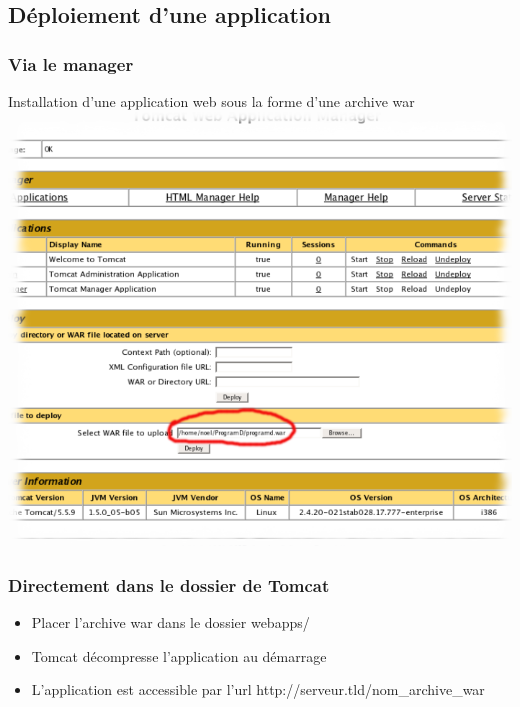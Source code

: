 \subsection{Déploiement d'une application}
\begin{frame}
\frametitle{Via le manager}
	Installation d'une application web sous la forme d'une archive war
  \includegraphics[scale=0.3]{Images/tomcat-deploy-war.png}
\end{frame}

\begin{frame}
  \frametitle{Directement dans le dossier de Tomcat}

  \begin{itemize}
    \item Placer l'archive war dans le dossier webapps/
    \item Tomcat décompresse l'application au démarrage
    \item L'application est accessible par l'url http://serveur.tld/nom\_archive\_war
  \end{itemize}
\end{frame}

